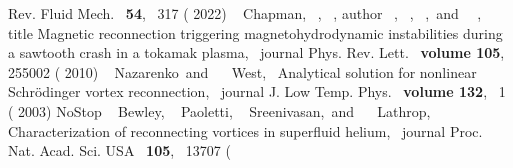 \documentclass[%
superscriptaddress,
 amsmath,amssymb,
 aps,
]{revtex4-2}
\begin{document}
\begin{thebibliography}{37}
{{{	  Rev. Fluid Mech.}\ }\textbf { {54}},\  {317}
	  ( {2022})}%
	  \BibitemOpen
	   { {\ \bibnamefont
	  {Chapman}},  {~},
	   {\ }, \bibinfo
	  {author} {\ }, 
	  {\ }, 
	  {~},\ and\ 
	  {~},\ } {\bibinfo
	  {title} {Magnetic reconnection triggering magnetohydrodynamic instabilities
	  during a sawtooth crash in a tokamak plasma},\ }\href@noop {} {\bibfield
	  {journal} { {Phys. Rev. Lett.}\ }\textbf {\bibinfo
	  {volume} {105}},\  {255002} (
	  {2010})}%
	  \BibitemOpen
	   { {~\bibnamefont
	  {Nazarenko}}\ and\  {~\bibnamefont
	  {West}},\ } { {Analytical solution for
	  nonlinear {Schr{\"o}dinger} vortex reconnection},\ }\href@noop {} {\bibfield
	  {journal} { {J. Low Temp. Phys.}\ }\textbf {\bibinfo
	  {volume} {132}},\  {1} ( {2003})}\BibitemShut
	  {NoStop}%
	  \BibitemOpen
	   { {\ \bibnamefont
	  {Bewley}},  {\ \bibnamefont
	  {Paoletti}},  {\ \bibnamefont
	  {Sreenivasan}},\ and\  {\ \bibnamefont
	  {Lathrop}},\ } { {Characterization of
	  reconnecting vortices in superfluid helium},\ }\href@noop {} {\bibfield
	  {journal} { {Proc. Nat. Acad. Sci. USA}\ }\textbf
	  { {105}},\  {13707} (
}
\end{thebibliography}
\end{document}
